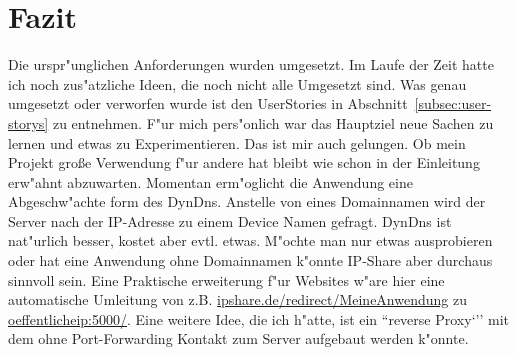 
\chapter{Fazit}\label{ch:fazit}
Die urspr{"u}nglichen Anforderungen wurden umgesetzt.
Im Laufe der Zeit hatte ich noch zus{"a}tzliche Ideen, die noch nicht alle Umgesetzt sind.
Was genau umgesetzt oder verworfen wurde ist den UserStories in Abschnitt~\ref{subsec:user-storys} zu entnehmen.
F{"u}r mich pers{"o}nlich war das Hauptziel neue Sachen zu lernen und etwas zu Experimentieren.
Das ist mir auch gelungen.
Ob mein Projekt gro{\ss}e Verwendung f{"u}r andere hat bleibt wie schon in der Einleitung erw{"a}hnt abzuwarten.
Momentan erm{"o}glicht die Anwendung eine Abgeschw{"a}chte form des DynDns.
Anstelle von eines Domainnamen wird der Server nach der IP-Adresse zu einem Device Namen gefragt.
DynDns ist nat{"u}rlich besser, kostet aber evtl. etwas.
M{"o}chte man nur etwas ausprobieren oder hat eine Anwendung ohne Domainnamen k{"o}nnte IP-Share aber durchaus sinnvoll sein.
Eine Praktische erweiterung f{"u}r Websites w{"a}re hier eine automatische Umleitung von z.B. \url{ipshare.de/redirect/MeineAnwendung} zu \url{oeffentlicheip:5000/}.
Eine weitere Idee, die ich h{"a}tte, ist ein ``reverse Proxy`'' mit dem ohne Port-Forwarding Kontakt zum Server aufgebaut werden k{"o}nnte.
